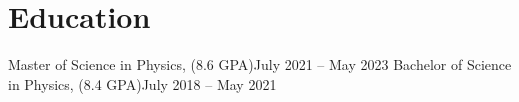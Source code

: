 
\section{Education}
\resumeHeadingListStart{}
{Master of Science in Physics, (8.6 GPA)}{July 2021 -- May 2023}
\resumeHeadingListEnd{}
\resumeHeadingListStart{}
{Bachelor of Science in Physics, (8.4 GPA)}{July 2018 -- May 2021}
\resumeHeadingListEnd{}